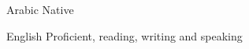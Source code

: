 
\begin{cvskills}

  \cvskill
    {Arabic} %
    {Native} %

  \cvskill
    {English} %
    {Proficient, reading, writing and speaking} %
\end{cvskills}